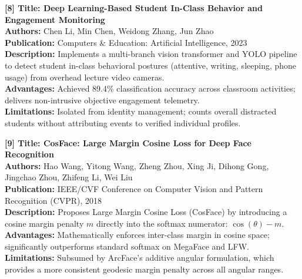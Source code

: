 \vspace{0.15in}
\begin{flushleft}
{\fontsize{12pt}{14pt}\selectfont \textbf{[8] Title: Deep Learning-Based Student In-Class Behavior and Engagement Monitoring}} \\
\textbf{Authors:} Chen Li, Min Chen, Weidong Zhang, Jun Zhao \\
\textbf{Publication:} Computers \& Education: Artificial Intelligence, 2023 \\
\textbf{Description:} Implements a multi-branch vision transformer and YOLO pipeline to detect student in-class behavioral postures (attentive, writing, sleeping, phone usage) from overhead lecture video cameras. \\
\textbf{Advantages:} Achieved 89.4\% classification accuracy across classroom activities; delivers non-intrusive objective engagement telemetry. \\
\textbf{Limitations:} Isolated from identity management; counts overall distracted students without attributing events to verified individual profiles.
\end{flushleft}

\vspace{0.15in}
\begin{flushleft}
{\fontsize{12pt}{14pt}\selectfont \textbf{[9] Title: CosFace: Large Margin Cosine Loss for Deep Face Recognition}} \\
\textbf{Authors:} Hao Wang, Yitong Wang, Zheng Zhou, Xing Ji, Dihong Gong, Jingchao Zhou, Zhifeng Li, Wei Liu \\
\textbf{Publication:} IEEE/CVF Conference on Computer Vision and Pattern Recognition (CVPR), 2018 \\
\textbf{Description:} Proposes Large Margin Cosine Loss (CosFace) by introducing a cosine margin penalty $m$ directly into the softmax numerator: $\cos(\theta) - m$. \\
\textbf{Advantages:} Mathematically enforces inter-class margin in cosine space; significantly outperforms standard softmax on MegaFace and LFW. \\
\textbf{Limitations:} Subsumed by ArcFace's additive angular formulation, which provides a more consistent geodesic margin penalty across all angular ranges.
\end{flushleft}

